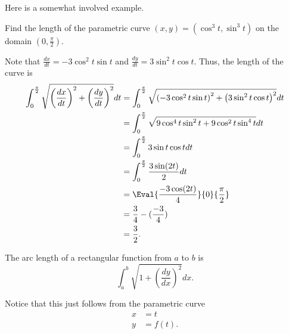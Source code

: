 \documentclass[mast]{lucky}
\begin{document}
\begin{center}
\end{center}

Here is a somewhat involved example.

\begin{exam}
Find the length of the parametric curve $(x,y)=(\cos^3t,\sin^3t)$ on the domain $(0,\frac{\pi}{2})$.
\end{exam}

\begin{sol}
Note that $\frac{dx}{dt}=-3\cos^2t\sin t$ and $\frac{dy}{dt}=3\sin^2t\cos t$. Thus, the length of the curve is
\begin{align*}
\int_{0}^{\frac{\pi}{2}}\sqrt{\left(\frac{dx}{dt}\right)^2+\left(\frac{dy}{dt}\right)^2}dt&=\int_{0}^{\frac{\pi}{2}}\sqrt{\left(-3\cos^2t\sin t\right)^2+\left(3\sin^2t\cos t\right)^2}dt \\
&=\int_{0}^{\frac{\pi}{2}}\sqrt{9\cos^4t\sin^2t+9\cos^2t\sin^4t}dt \\
&=\int_{0}^{\frac{\pi}{2}}3\sin t\cos tdt \\
&=\int_{0}^{\frac{\pi}{2}}\frac{3\sin(2t)}{2}dt \\
&=\Eval{\frac{-3\cos(2t)}{4}}{0}{\frac{\pi}{2}} \\
&=\frac{3}{4}-(\frac{-3}{4}) \\
&=\frac{3}{2}.
\end{align*}
\end{sol}

\begin{theo}
The arc length of a rectangular function from $a$ to $b$ is
\[\int_a^b \sqrt{1+\left(\frac{dy}{dx}\right)^2}dx.\]
\end{theo}

Notice that this just follows from the parametric curve
\begin{align*}
x&=t \\
y&=f(t).
\end{align*}
\end{document}
